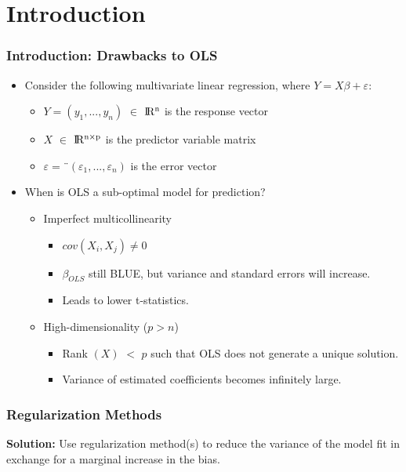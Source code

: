 \section{Introduction}%
\begin{frame}[fragile]
    \frametitle{Introduction: Drawbacks to OLS}
    \begin{itemize}
        \item Consider the following multivariate linear regression, where $Y=X\beta + \varepsilon$: 
            \begin{itemize}
                \item $Y=(y_1,...,y_n)$ $\in$ ${\rm I\!R^{n}}$ is the response vector
                \item $X$ $\in$ ${\rm I\!R^{n \times p}}$ is the predictor variable matrix
                \item $\varepsilon=¨(\varepsilon_1,...,\varepsilon_n)$ is the error vector
            \end{itemize}
        \item When is OLS a sub-optimal model for prediction? 
            \begin{itemize}
                \item Imperfect multicollinearity
                    \begin{itemize}
                        \item $cov(X_i, X_j)\neq 0$
                        \item $\beta_{OLS}$ still BLUE, but variance and standard errors will increase.
                        \item Leads to lower t-statistics.
                    \end{itemize}
                \item High-dimensionality ($p > n$)
                    \begin{itemize}
                        \item Rank $(X)$ $<$ $p$ such that OLS does not generate a unique solution.
                        \item Variance of estimated coefficients becomes infinitely large.
                    \end{itemize}
            \end{itemize}
    \end{itemize}
\end{frame}
\begin{frame}[fragile, c]
\frametitle{Regularization Methods}
    \begin{center}
        \textbf{Solution:} Use regularization method(s) to reduce the variance of the model fit in exchange for a marginal increase in the bias.
    \end{center}
\end{frame}
